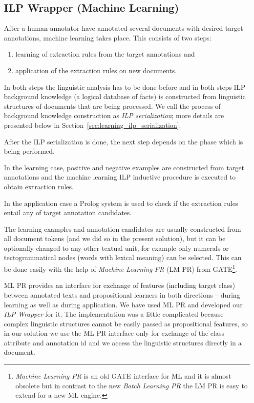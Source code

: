\subsection{ILP Wrapper (Machine Learning)} \label{sec:learning_ilp_wrapper}
After a human annotator have annotated several documents with desired target annotations, machine learning takes place. 
This consists of two steps: 
\begin{enumerate}
	\item learning of extraction rules from the target annotations and
	\item application of the extraction rules on new documents.
\end{enumerate}
In both steps the linguistic analysis has to be done before and in both steps ILP background knowledge (a logical database of facts) is constructed from linguistic structures of documents that are being processed. We call the process of background knowledge construction as \emph{ILP serialization}; more details are presented below in Section~\ref{sec:learning_ilp_serialization}.

After the ILP serialization is done, the next step depends on the phase which is being performed.

In the learning case, positive and negative examples are constructed from target annotations and the machine learning ILP inductive procedure is executed to obtain extraction rules.

In the application case a Prolog system is used to check if the extraction rules entail any of target annotation candidates.




The learning examples and annotation candidates are usually constructed from all document tokens (and we did so in the present solution), but it can be optionally changed to any other textual unit, for example only numerals or tectogrammatical nodes (words with lexical meaning) can be selected. This can be done easily with the help of \emph{Machine Learning PR} (LM PR) from GATE\footnote{\emph{Machine Learning PR} is an old GATE interface for ML and it is almost obsolete but in contrast to the new \emph{Batch Learning PR} the LM PR is easy to extend for a new ML engine.}.

ML PR provides an interface for exchange of features (including target class) between annotated texts and propositional learners in both directions -- during learning as well as during application. We have used ML PR and developed our \emph{ILP Wrapper} for it. The implementation was a little complicated because complex linguistic structures cannot be easily passed as propositional features, so in our solution we use the ML PR interface only for exchange of the class attribute and annotation id and we access the linguistic structures directly in a document.




